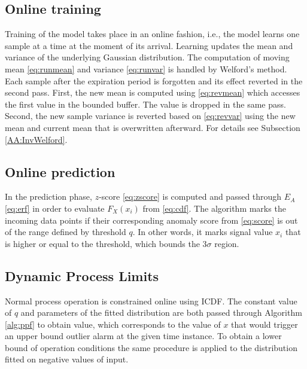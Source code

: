 \subsection{Online training}\label{train}
Training of the model takes place in an online fashion, i.e., the model learns one sample at a time at the moment of its arrival. Learning updates the mean and variance of the underlying Gaussian distribution. The computation of moving mean \eqref{eq:runmean} and variance \eqref{eq:runvar} is handled by Welford's method. Each sample after the expiration period is forgotten and its effect reverted in the second pass. First, the new mean is computed using \eqref{eq:revmean} which accesses the first value in the bounded buffer. The value is dropped in the same pass. Second, the new sample variance is reverted based on \eqref{eq:revvar} using the new mean and current mean that is overwritten afterward. For details see Subsection \ref{AA:InvWelford}.

\subsection{Online prediction}\label{predict}
In the prediction phase, \(z\)-score \eqref{eq:zscore} is computed and passed through $E_A$ \eqref{eq:erf} in order to evaluate $F_{X}(x_i)$ from \eqref{eq:cdf}. The algorithm marks the incoming data points if their corresponding anomaly score from \eqref{eq:score} is out of the range defined by threshold \(q\). In other words, it marks signal value \(x_i\) that is higher or equal to the threshold, which bounds the $3\sigma$ region.

\subsection{Dynamic Process Limits}\label{constrait}
Normal process operation is constrained online using ICDF. The constant value of \(q\) and parameters of the fitted distribution are both passed through Algorithm \ref{alg:ppf} to obtain value, which corresponds to the value of \(x\) that would trigger an upper bound outlier alarm at the given time instance. To obtain a lower bound of operation conditions the same procedure is applied to the distribution fitted on negative values of input.

